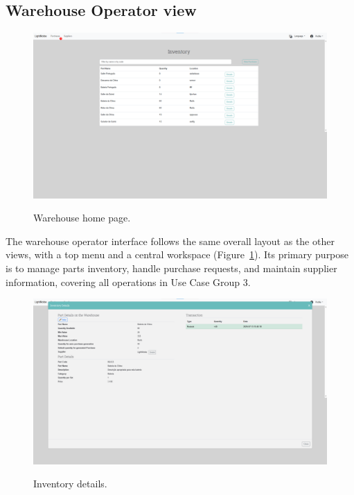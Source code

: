 \subsection{Warehouse Operator view}


\begin{figure}[h]
  \caption{Warehouse home page.}
  \centering
  \includegraphics[width=\textwidth]{figs/Implementation/warehouse/homepage}
  \label{fig:warehouseHomepage}
\end{figure}



The warehouse operator interface follows the same overall layout as the other views, with a top menu and a central workspace (Figure~\ref{fig:warehouseHomepage}). Its primary purpose is to manage parts inventory, handle purchase requests, and maintain supplier information, covering all operations in Use Case Group 3.


\begin{figure}[h]
  \caption{Inventory details.}
  \centering
  \includegraphics[width=\textwidth]{figs/Implementation/warehouse/inventoryDetails}
  \label{fig:inventoryDetails}
\end{figure}


